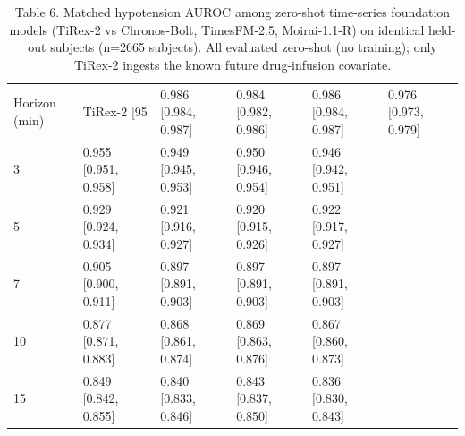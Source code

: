 \begin{table}[t]\centering\footnotesize
\caption{Table 6. Matched hypotension AUROC among zero-shot time-series foundation models (TiRex-2 vs Chronos-Bolt, TimesFM-2.5, Moirai-1.1-R) on identical held-out subjects (n=2665 subjects). All evaluated zero-shot (no training); only TiRex-2 ingests the known future drug-infusion covariate.}
\begin{tabular}{lllll}
\toprule
Horizon (min) & TiRex-2 [95%
 & 0.986 [0.984, 0.987] & 0.984 [0.982, 0.986] & 0.986 [0.984, 0.987] & 0.976 [0.973, 0.979] \\
3 & 0.955 [0.951, 0.958] & 0.949 [0.945, 0.953] & 0.950 [0.946, 0.954] & 0.946 [0.942, 0.951] \\
5 & 0.929 [0.924, 0.934] & 0.921 [0.916, 0.927] & 0.920 [0.915, 0.926] & 0.922 [0.917, 0.927] \\
7 & 0.905 [0.900, 0.911] & 0.897 [0.891, 0.903] & 0.897 [0.891, 0.903] & 0.897 [0.891, 0.903] \\
10 & 0.877 [0.871, 0.883] & 0.868 [0.861, 0.874] & 0.869 [0.863, 0.876] & 0.867 [0.860, 0.873] \\
15 & 0.849 [0.842, 0.855] & 0.840 [0.833, 0.846] & 0.843 [0.837, 0.850] & 0.836 [0.830, 0.843] \\
\bottomrule
\end{tabular}
\end{table}
